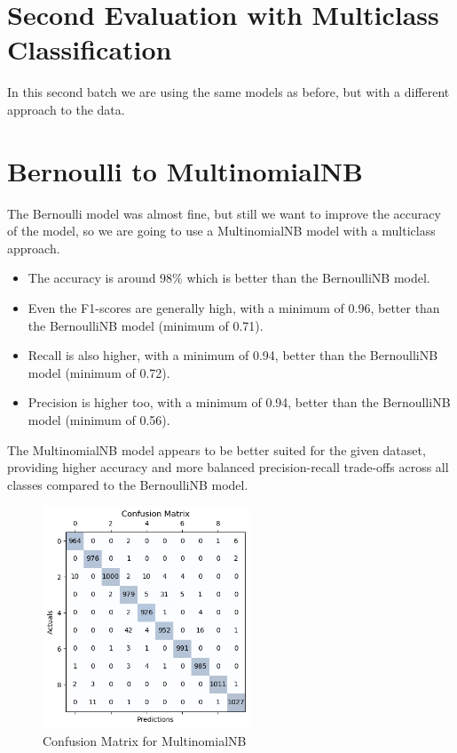 \documentclass{article}
\begin{document}
\begin{titlepage}
  \section*{Second Evaluation with Multiclass Classification}
  In this second batch we are using the same models as before, but with a different approach to the data.

  \section{Bernoulli to MultinomialNB}
  The Bernoulli model was almost fine, but still we want to improve the accuracy of the model, so we are going to use a MultinomialNB model with a multiclass approach.

  \begin{itemize}
    \item The accuracy is around 98\% which is better than the BernoulliNB model.
    \item Even the F1-scores are generally high, with a minimum of 0.96, better than the BernoulliNB model (minimum of 0.71).
    \item Recall is also higher, with a minimum of 0.94, better than the BernoulliNB model (minimum of 0.72).
    \item Precision is higher too, with a minimum of 0.94, better than the BernoulliNB model (minimum of 0.56).
  \end{itemize}

  The MultinomialNB model appears to be better suited for the given dataset, providing higher accuracy and more balanced precision-recall trade-offs across all classes compared to the BernoulliNB model.
  \newline
  \newline

  \begin{figure}[htbp]
    \centering
    \includegraphics[width=0.55\textwidth]{MNCM.png}
    \caption{Confusion Matrix for MultinomialNB}
    \label{fig:sample4}
  \end{figure}


\end{titlepage}
\end{document}

